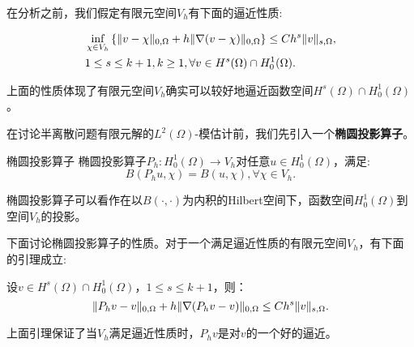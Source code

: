 在分析之前，我们假定有限元空间$V_{h}$有下面的逼近性质:
\begin{proposition}
    \begin{equation}
        \begin{aligned}
            &\inf_{\chi\in V_{h}}\left\{\|v-\chi\|_{0,\Omega}+h\|\nabla(v-\chi)\|_{0,\Omega}\right\}\le Ch^{s}\|v\|_{s,\Omega},\\
            &1\le s\le k+1, k\ge 1, \forall v \in H^{s}(\Omega)\cap H_{0}^{1}(\Omega).
        \end{aligned}
    \end{equation}
\end{proposition}
\begin{remark}
    上面的性质体现了有限元空间$V_{h}$确实可以较好地逼近函数空间$H^{s}(\Omega)\cap H_{0}^{1}(\Omega)$。
\end{remark}
在讨论半离散问题有限元解的$L^{2}(\Omega)$-模估计前，我们先引入一个\textbf{椭圆投影算子}。
\begin{definition}{椭圆投影算子}
    椭圆投影算子$P_{h}:H_{0}^{1}(\Omega)\rightarrow V_{h}$对任意$u\in H_{0}^{1}(\Omega)$，满足:
    \begin{equation}
        B(P_{h}u,\chi)=B(u,\chi),\forall \chi\in V_{h}.
    \end{equation}
\end{definition}
\begin{remark}
    椭圆投影算子可以看作在以$B(\cdot,\cdot)$为内积的Hilbert空间下，函数空间$H_{0}^{1}(\Omega)$到空间$V_{h}$的投影。
\end{remark}
下面讨论椭圆投影算子的性质。对于一个满足逼近性质的有限元空间$V_{h}$，有下面的引理成立:
\begin{lemma}
    \label{lem:proj}
    设$v\in H^{s}(\Omega)\cap H_{0}^{1}(\Omega)$，$1\le s\le k+1$，则：
    \begin{equation}
        \|P_{h}v-v\|_{0,\Omega}+h\|\nabla(P_{h}v-v)\|_{0,\Omega}\le Ch^{s}\|v\|_{s,\Omega}.
    \end{equation}
\end{lemma}
\begin{remark}
    上面引理保证了当$V_{h}$满足逼近性质时，$P_{h}v$是对$v$的一个好的逼近。
\end{remark}
